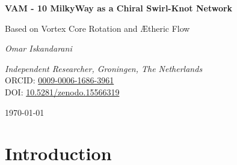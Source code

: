 \documentclass[12pt]{article}
\begin{document}
    \titlepageOpen


    \begin{abstract}

    \end{abstract}



\begin{titlepage}
    \thispagestyle{empty}
    \centering
    \vspace*{2cm}
    {\Huge\bfseries VAM - 10 MilkyWay as a Chiral Swirl-Knot Network \par}
    \vspace{0.5cm}
    {\Large Based on Vortex Core Rotation and Ætheric Flow \par}
    \vspace{2cm}
    {\Large\itshape Omar Iskandarani\par}
    \vspace{0.5cm}
    \textit{Independent Researcher, Groningen, The Netherlands} \\
    ORCID: \href{https://orcid.org/0009-0006-1686-3961}{0009-0006-1686-3961} \\
    DOI: \href{https://doi.org/10.5281/zenodo.15566319}{10.5281/zenodo.15566319} \\
    \vfill
    {\large \today\par}
\end{titlepage}

    \tableofcontents

    \section{Introduction}\label{sec:introduction}
    

    \appendix
    \def\standalonechapter{false}
    

    
    
\end{document}

